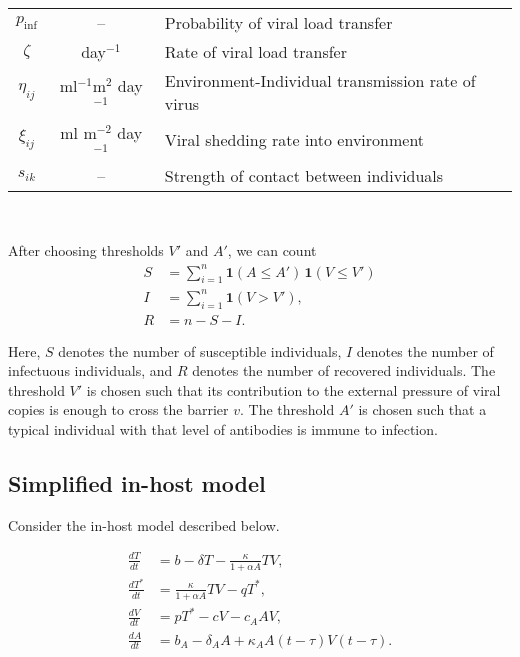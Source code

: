 \documentclass[11pt]{article}
\numberwithin{equation}{subsection}
\newcommand{\iv}{$^{-1}$}
\begin{document}
\begin{table}[h!]
\begin{tabular}{ccl}
            $p_\text{inf}$  & --
                                    & Probability of viral load transfer \\
            $\zeta$     & day\iv
                                    & Rate of viral load transfer \\
            $\eta_{ij}$ & ml\iv m$^2$ day\iv
                                    & Environment-Individual transmission rate of virus\\
            $\xi_{ij}$  & ml m$^{-2}$ day\iv
                                    & Viral shedding rate into environment \\
            $s_{ik}$    & --
                                    & Strength of contact between individuals \\
            \hline
        \end{tabular}
        \label{tab:parameter}
    \end{table}

    ~

    After choosing thresholds $V'$ and $A'$, we can count \begin{align}
        S &= \sum_{i = 1}^n \mathbf{1}(A \leq A')\, \mathbf{1}(V \leq V') \\
        I &= \sum_{i = 1}^n \mathbf{1}(V > V'), \\
        R &= n - S - I.
    \end{align}

    Here, $S$ denotes the number of susceptible individuals, $I$ denotes the
    number of infectuous individuals, and $R$ denotes the number of recovered
    individuals. The threshold $V'$ is chosen such that its contribution to
    the external pressure of viral copies is enough to cross the barrier $v$.
    The threshold $A'$ is chosen such that a typical individual with that
    level of antibodies is immune to infection.


    \subsection{Simplified in-host model} \label{model:inhost}

    Consider the in-host model described below.

    \begin{align}
        \frac{dT}{dt} &= b -  \delta T - \frac{\kappa}{1 + \alpha A} TV, \\
        \frac{dT^*}{dt} &= \frac{\kappa}{1 + \alpha A} TV - qT^*, \\
        \frac{dV}{dt} &= pT^* - cV - c_A AV, \\
        \frac{dA}{dt} &= b_A -  \delta_A A + \kappa_A A(t - \tau)V(t - \tau).
    \end{align}
\end{document}
